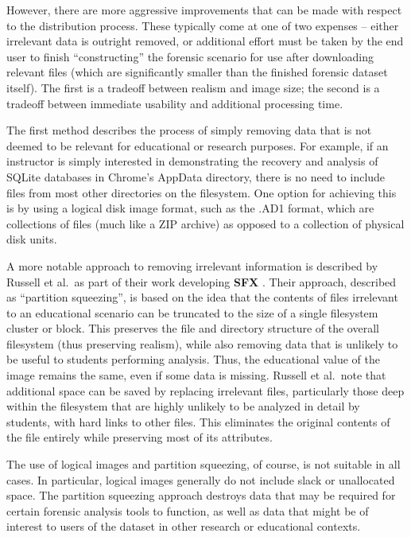 \documentclass[letterpaper,12pt]{report}
\begin{document}
However, there are more aggressive improvements that can be made with
respect to the distribution process. These typically come at one of two
expenses -- either irrelevant data is outright removed, or additional
effort must be taken by the end user to finish ``constructing'' the
forensic scenario for use after downloading relevant files (which are
significantly smaller than the finished forensic dataset itself). The
first is a tradeoff between realism and image size; the second is a
tradeoff between immediate usability and additional processing time.

The first method describes the process of simply removing data that is
not deemed to be relevant for educational or research purposes. For
example, if an instructor is simply interested in demonstrating the
recovery and analysis of SQLite databases in Chrome's AppData directory,
there is no need to include files from most other directories on the
filesystem. One option for achieving this is by using a logical disk
image format, such as the .AD1 format, which are collections of files
(much like a ZIP archive) as opposed to a collection of physical disk
units.

A more notable approach to removing irrelevant information is described
by Russell et al.~as part of their work developing \textbf{SFX}
\cite{russellForensicImageDescription2012}. Their approach,
described as ``partition squeezing'', is based on the idea that the
contents of files irrelevant to an educational scenario can be truncated
to the size of a single filesystem cluster or block. This preserves the
file and directory structure of the overall filesystem (thus preserving
realism), while also removing data that is unlikely to be useful to
students performing analysis. Thus, the educational value of the image
remains the same, even if some data is missing. Russell et al.~note that
additional space can be saved by replacing irrelevant files,
particularly those deep within the filesystem that are highly unlikely
to be analyzed in detail by students, with hard links to other files.
This eliminates the original contents of the file entirely while
preserving most of its attributes.

The use of logical images and partition squeezing, of course, is not
suitable in all cases. In particular, logical images generally do not
include slack or unallocated space. The partition squeezing approach
destroys data that may be required for certain forensic analysis tools
to function, as well as data that might be of interest to users of the
dataset in other research or educational contexts.
\end{document}

